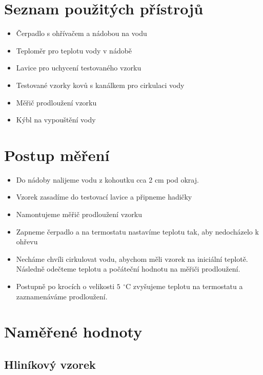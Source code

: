 \documentclass[a4paper,12pt]{article}
\newcommand{\unitC}{\,^\circ\mathrm{C}}
\begin{document}
\section{Seznam použitých přístrojů}
\begin{itemize}
    \item Čerpadlo s ohřívačem a nádobou na vodu
    \item Teploměr pro teplotu vody v nádobě
    \item Lavice pro uchycení testovaného vzorku
    \item Testované vzorky kovů s kanálkem pro cirkulaci vody
    \item Měřič prodloužení vzorku
    \item Kýbl na vypouštění vody
\end{itemize}

\section{Postup měření}
\begin{itemize}
    \item Do nádoby nalijeme vodu z kohoutku cca 2 cm pod okraj.
    \item Vzorek zasadíme do testovací lavice a připneme hadičky
    \item Namontujeme měřič prodloužení vzorku
    \item Zapneme čerpadlo a na termostatu nastavíme teplotu tak, aby nedocházelo k ohřevu
    \item Necháme chvíli cirkulovat vodu, abychom měli vzorek na iniciální teplotě. Následně odečteme teplotu a počáteční hodnotu na měřiči prodloužení.
    \item Postupně po krocích o velikosti $5\ \unitC$ zvyšujeme teplotu na termostatu a zaznamenáváme prodloužení.
\end{itemize}

\newpage
\section{Naměřené hodnoty}

\subsection{Hliníkový vzorek}
\end{document}
